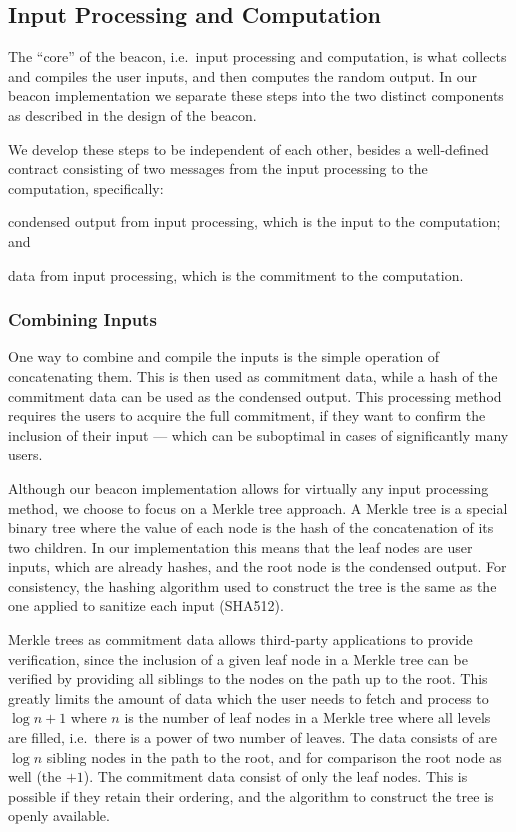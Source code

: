 \subsection{Input Processing and Computation}%
\label{sub:input_processing_and_computation}
The \enquote{core} of the beacon, i.e.\ input processing and computation, is what collects and compiles the user inputs, and then computes the random output.
In our beacon implementation we separate these steps into the two distinct components as described in the design of the beacon.

We develop these steps to be independent of each other, besides a well-defined contract consisting of two messages from the input processing to the computation, specifically:
\begin{eletterate*}
\item condensed output from input processing, which is the input to the computation; and
\item data from input processing, which is the commitment to the computation.
\end{eletterate*}

\subsubsection{Combining Inputs}%
\label{ssub:combining_inputs}
One way to combine and compile the inputs is the simple operation of concatenating them.
This is then used as commitment data, while a hash of the commitment data can be used as the condensed output.
This processing method requires the users to acquire the full commitment, if they want to confirm the inclusion of their input --- which can be suboptimal in cases of significantly many users.

Although our beacon implementation allows for virtually any input processing method, we choose to focus on a Merkle tree approach.
A Merkle tree is a special binary tree where the value of each node is the hash of the concatenation of its two children.
In our implementation this means that the leaf nodes are user inputs, which are already hashes, and the root node is the condensed output.
For consistency, the hashing algorithm used to construct the tree is the same as the one applied to sanitize each input (SHA512).

Merkle trees as commitment data allows third-party applications to provide verification, since the inclusion of a given leaf node in a Merkle tree can be verified by providing all siblings to the nodes on the path up to the root.
This greatly limits the amount of data which the user needs to fetch and process to $\log{n} + 1$ where $n$ is the number of leaf nodes in a Merkle tree where all levels are filled, i.e.\ there is a power of two number of leaves.
The data consists of are $\log{n}$ sibling nodes in the path to the root, and for comparison the root node as well (the $+1$).
The commitment data consist of only the leaf nodes.
This is possible if they retain their ordering, and the algorithm to construct the tree is openly available.

